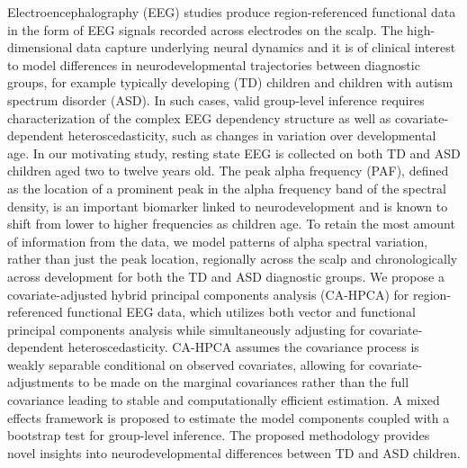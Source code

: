 
Electroencephalography (EEG) studies produce region-referenced functional data in the form of EEG signals recorded across electrodes on the scalp. The high-dimensional data capture underlying neural dynamics and it is of clinical interest to model differences in neurodevelopmental trajectories between diagnostic groups, for example typically developing (TD) children and children with autism spectrum disorder (ASD). In such cases, valid group-level inference requires characterization of the complex EEG dependency structure as well as covariate-dependent heteroscedasticity, such as changes in variation over developmental age. In our motivating study, resting state EEG is collected on both TD and ASD children aged two to twelve years old. The peak alpha frequency (PAF), defined as the location of a prominent peak in the alpha frequency band of the spectral density, is an important biomarker linked to neurodevelopment and is known to shift from lower to higher frequencies as children age. To retain the most amount of information from the data, we model patterns of alpha spectral variation, rather than just the peak location, regionally across the scalp and chronologically across development for both the TD and ASD diagnostic groups. We propose a covariate-adjusted hybrid principal components analysis (CA-HPCA) for region-referenced functional EEG data, which utilizes both vector and functional principal components analysis while simultaneously adjusting for covariate-dependent heteroscedasticity. CA-HPCA assumes the covariance process is weakly separable conditional on observed covariates, allowing for covariate-adjustments to be made on the marginal covariances rather than the full covariance leading to stable and computationally efficient estimation. A mixed effects framework is proposed to estimate the model components coupled with a bootstrap test for group-level inference. The proposed methodology provides novel insights into neurodevelopmental differences between TD and ASD children. 




